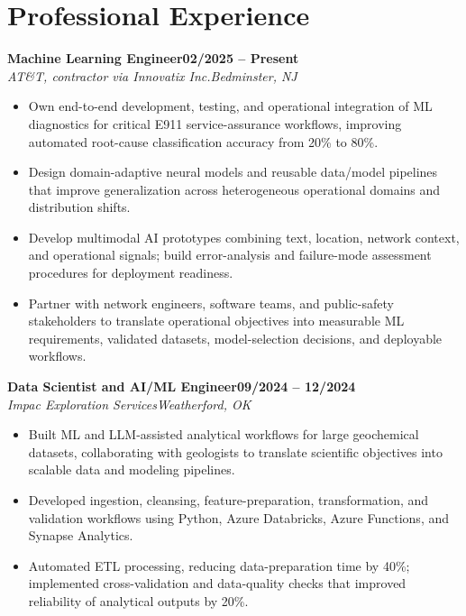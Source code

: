 \documentclass[10pt,letterpaper]{extarticle}
\newcommand{\role}[4]{\Needspace{3\baselineskip}\textbf{#1}\hfill\textbf{#2}\\[-1pt]\textit{#3}\hfill\textit{#4}\par}
\begin{document}
\section{Professional Experience}
\role{Machine Learning Engineer}{02/2025 -- Present}{AT\&T, contractor via Innovatix Inc.}{Bedminster, NJ}
\begin{itemize}
\item Own end-to-end development, testing, and operational integration of ML diagnostics for critical E911 service-assurance workflows, improving automated root-cause classification accuracy from 20\% to 80\%.
\item Design domain-adaptive neural models and reusable data/model pipelines that improve generalization across heterogeneous operational domains and distribution shifts.
\item Develop multimodal AI prototypes combining text, location, network context, and operational signals; build error-analysis and failure-mode assessment procedures for deployment readiness.
\item Partner with network engineers, software teams, and public-safety stakeholders to translate operational objectives into measurable ML requirements, validated datasets, model-selection decisions, and deployable workflows.
\end{itemize}

\role{Data Scientist and AI/ML Engineer}{09/2024 -- 12/2024}{Impac Exploration Services}{Weatherford, OK}
\begin{itemize}
\item Built ML and LLM-assisted analytical workflows for large geochemical datasets, collaborating with geologists to translate scientific objectives into scalable data and modeling pipelines.
\item Developed ingestion, cleansing, feature-preparation, transformation, and validation workflows using Python, Azure Databricks, Azure Functions, and Synapse Analytics.
\item Automated ETL processing, reducing data-preparation time by 40\%; implemented cross-validation and data-quality checks that improved reliability of analytical outputs by 20\%.
\end{itemize}
\end{document}
